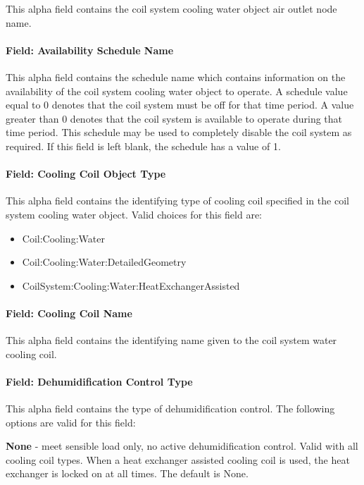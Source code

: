 This alpha field contains the coil system cooling water object air outlet node name.

\paragraph{Field: Availability Schedule Name}

This alpha field contains the schedule name which contains information on the availability of the coil system cooling water object to operate. A schedule value equal to 0 denotes that the coil system must be off for that time period. A value greater than 0 denotes that the coil system is available to operate during that time period. This schedule may be used to completely disable the coil system as required. If this field is left blank, the schedule has a value of 1.

\paragraph{Field: Cooling Coil Object Type}\label{field-cooling-coil-object-type-01}

This alpha field contains the identifying type of cooling coil specified in the coil system cooling water object. Valid choices for this field are:
\begin{itemize}
\item Coil:Cooling:Water
\item Coil:Cooling:Water:DetailedGeometry
\item CoilSystem:Cooling:Water:HeatExchangerAssisted
\end{itemize}


\paragraph{Field: Cooling Coil Name}\label{field-cooling-coil-name-01}

This alpha field contains the identifying name given to the coil system water cooling coil.

\paragraph{Field: Dehumidification Control Type}

This alpha field contains the type of dehumidification control. The following options are valid for this field:

\textbf{None} - meet sensible load only, no active dehumidification control. Valid with all cooling coil types. When a heat exchanger assisted cooling coil is used, the heat exchanger is locked on at all times. The default is None.

